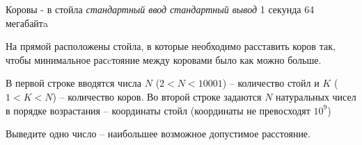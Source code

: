\begin{problem}%
{Коровы - в стойла}%
{\textsl{стандартный ввод}}%
{\textsl{стандартный вывод}}%
{1 секунда}%
{64 мегабайтa}{}

На прямой расположены стойла, в которые необходимо расставить коров так, чтобы минимальное расcтояние между коровами было как можно больше.

\InputFile

В первой строке вводятся числа $N$ ($2 < N < 10001$) – количество стойл и $K$ ($1 < K < N$) – количество коров. Во второй строке задаются $N$ натуральных чисел в порядке возрастания – координаты стойл (координаты не превосходят $10^9$)

\OutputFile

Выведите одно число – наибольшее возможное допустимое расстояние.

\Examples

\begin{example}
%
\end{example}
\end{problem}
